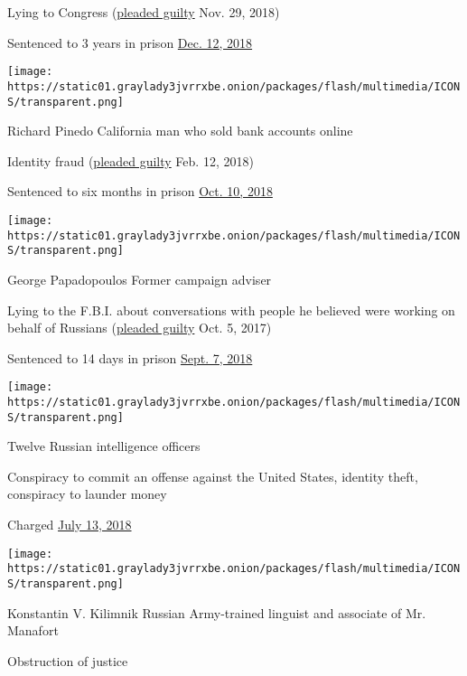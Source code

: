 Lying to Congress
(\href{https://www.nytimes3xbfgragh.onion/2018/11/29/nyregion/michael-cohen-trump-russia-mueller.html}{pleaded
guilty} Nov. 29, 2018)

Sentenced to 3 years in prison
\href{https://www.nytimes3xbfgragh.onion/2018/12/12/nyregion/michael-cohen-sentence-trump.html}{Dec.
12, 2018}

\texttt{[image: https://static01.graylady3jvrrxbe.onion/packages/flash/multimedia/ICONS/transparent.png]}

Richard Pinedo California man who sold bank accounts online

Identity fraud
(\href{https://www.nytimes3xbfgragh.onion/2018/02/16/us/politics/richard-pinedo-russia-bank-accounts-guilty-plea-mueller.html}{pleaded
guilty} Feb. 12, 2018)

Sentenced to six months in prison
\href{https://www.nytimes3xbfgragh.onion/2018/10/10/us/politics/richard-pinedo-sentencing-mueller.html}{Oct.
10, 2018}

\texttt{[image: https://static01.graylady3jvrrxbe.onion/packages/flash/multimedia/ICONS/transparent.png]}

George Papadopoulos Former campaign adviser

Lying to the F.B.I. about conversations with people he believed were
working on behalf of Russians
(\href{https://www.nytimes3xbfgragh.onion/2017/10/30/us/politics/george-papadopoulos-russia-trump.html}{pleaded
guilty} Oct. 5, 2017)

Sentenced to 14 days in prison
\href{https://www.nytimes3xbfgragh.onion/2018/09/07/us/politics/george-papadopoulos-sentencing-special-counsel-investigation.html}{Sept.
7, 2018}

\texttt{[image: https://static01.graylady3jvrrxbe.onion/packages/flash/multimedia/ICONS/transparent.png]}

Twelve Russian intelligence officers

Conspiracy to commit an offense against the United States, identity
theft, conspiracy to launder money

Charged
\href{https://www.nytimes3xbfgragh.onion/2018/07/13/us/politics/mueller-indictment-russian-intelligence-hacking.html}{July
13, 2018}

\texttt{[image: https://static01.graylady3jvrrxbe.onion/packages/flash/multimedia/ICONS/transparent.png]}

Konstantin V. Kilimnik Russian Army-trained linguist and associate of
Mr. Manafort

Obstruction of justice

